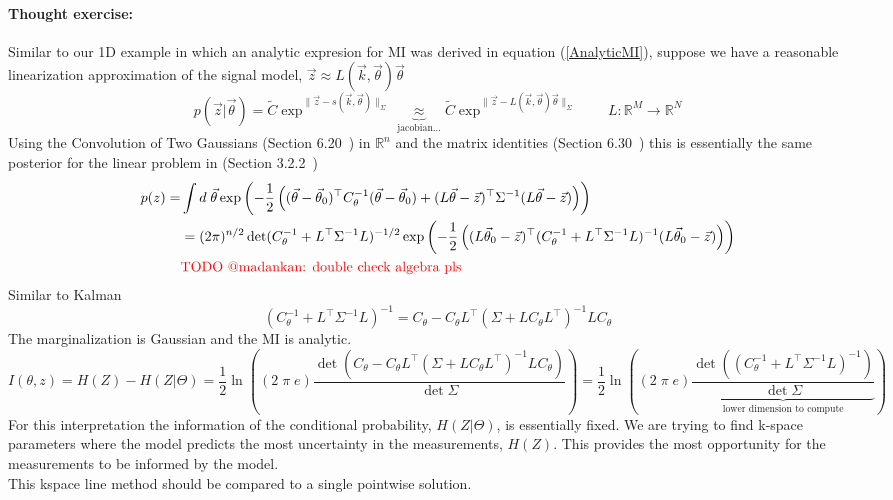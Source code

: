 \documentclass[10pt]{amsart}
\newcommand{\eqn}[1]{(\ref{#1})}
\begin{document}
\paragraph{\bf Thought exercise:}  Similar to our 1D example 
in which an analytic expresion for MI was derived in equation
\eqn{AnalyticMI}, suppose we have a reasonable  linearization
approximation of the signal model, $ \vec{z} \approx L(\vec{k},\vec{\theta}) \vec{\theta}$
\[
  p(\vec{z}|\vec{\theta}) = 
    \tilde{C} \exp^{\|\vec{z}- s(\vec{k},\vec{\theta} ) \|_\Sigma}
    \underbrace{\approx}_\text{jacobian...}
    \tilde{C} \exp^{\|\vec{z}- L(\vec{k},\vec{\theta}) \vec{\theta} \|_{\Sigma}}
\qquad
L:\mathbb{R}^M \rightarrow \mathbb{R}^N
\]
Using the Convolution of Two Gaussians
(Section 6.20~\cite{tarantola05}) in $\mathbb{R}^n$ 
and the matrix identities
(Section 6.30~\cite{tarantola05}) 
this is essentially the same posterior
for the linear problem in
(Section 3.2.2~\cite{tarantola05}) 
\[
\begin{split}
p(z) = & \int d\;\vec{\theta} 
   \exp 
   \left(
    -\frac{1}{2}
   \left(
    (\vec{\theta}-\vec{\theta}_0)^\top
    C_\theta^{-1}
    (\vec{\theta}-\vec{\theta}_0)
    + 
    (L \vec{\theta}-\vec{z})^\top
    \Sigma^{-1}
    (L \vec{\theta}-\vec{z})
   \right)
   \right)
\\
  & = (2 \pi)^{n/2} \det(C_\theta^{-1}+ L^\top \Sigma^{-1} L )^{-1/2}
   \exp 
   \left(
    -\frac{1}{2}
   \left(
    (L\vec{\theta}_0-\vec{z})^\top
    (C^{-1}_\theta + L^\top \Sigma^{-1}L)^{-1}
    (L\vec{\theta}_0-\vec{z})
   \right)
   \right)
\\
       &  \text{\color{red} TODO @madankan: double check algebra pls } 
\end{split}
\]
Similar to Kalman~\cite{Maybeck1994}
\[
    (C^{-1}_\theta + L^\top \Sigma^{-1} L)^{-1}
   = C_\theta  - C_\theta  L^\top (\Sigma + L  C_\theta  L^\top)^{-1} L C_\theta
\]
The marginalization is Gaussian and the MI is analytic.
\[
  I(\theta,z) = H(Z) - H(Z|\Theta) 
      = \frac{1}{2} \ln \left((2 \; \pi \; e) 
               \frac{\det \left(
     C_\theta  - C_\theta  L^\top (\Sigma + L  C_\theta  L^\top)^{-1} L C_\theta
                          \right) }{ \det \Sigma}
                         \right)
      = \frac{1}{2} \ln \left((2 \; \pi \; e) 
         \underbrace{
               \frac{\det \left(
    (C^{-1}_\theta + L^\top \Sigma^{-1} L)^{-1}
                          \right) }{ \det \Sigma}
                    }_\text{lower dimension to compute}
                         \right)
\]
{\color{red} 
For this interpretation the information of the 
conditional probability,  $H(Z|\Theta) $, is essentially fixed.
We are trying to find k-space parameters where the model predicts
the most uncertainty in the measurements, $ H(Z)$.
This provides the most opportunity for the measurements to be informed by 
the model.
\\[.2in]
This kspace line method should be compared to a single pointwise solution.
} 
\end{document}
